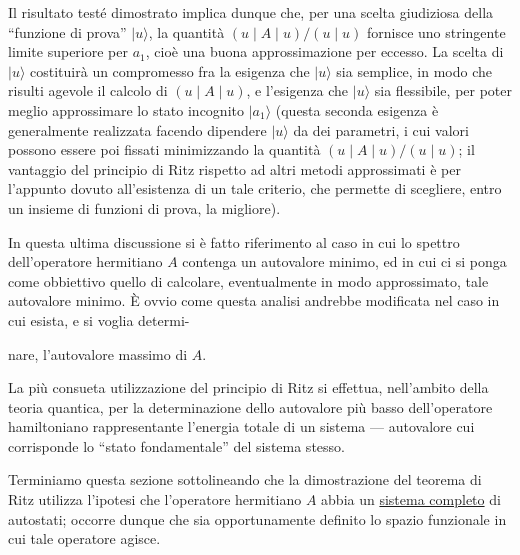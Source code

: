 \documentclass[11pt, a4paper]{book}
\numberwithin{equation}{section}
\begin{document}
Il risultato testé dimostrato implica dunque che, per una scelta
giudiziosa della ``funzione di prova'' $|u\rangle$, la quantità $(u \mid A \mid u)/(u \mid u)$
fornisce uno stringente limite superiore per $a_1$, cioè una buona approssimazione per eccesso. La scelta di $|u\rangle$ costituirà un compromesso
fra la esigenza che $|u\rangle$ sia semplice, in modo che risulti agevole
il calcolo di $(u \mid A \mid u)$, e l'esigenza che $|u\rangle$ sia flessibile,
per poter meglio approssimare lo stato incognito $|a_1\rangle$ (questa seconda
esigenza è generalmente realizzata facendo dipendere $|u\rangle$ da dei parametri, i cui valori possono essere poi fissati minimizzando la quantità
$(u \mid A \mid u) / (u \mid u)$; il vantaggio del principio di Ritz rispetto ad
altri metodi approssimati è per l'appunto dovuto all'esistenza di un tale
criterio, che permette di scegliere, entro un insieme di funzioni di prova,
la migliore).

In questa ultima discussione si è fatto riferimento al caso in cui
lo spettro dell'operatore hermitiano $A$ contenga un autovalore minimo,
ed in cui ci si ponga come obbiettivo quello di calcolare, eventualmente
in modo approssimato, tale autovalore minimo. È ovvio come questa
analisi andrebbe modificata nel caso in cui esista, e si voglia determi-


nare, l'autovalore massimo di $A$.

La più consueta utilizzazione del principio di Ritz si effettua, nell'ambito della teoria quantica, per la determinazione dello
autovalore più basso dell'operatore hamiltoniano rappresentante l'energia totale di un sistema --- autovalore cui corrisponde lo ``stato fondamentale'' del sistema stesso.

Terminiamo questa sezione sottolineando che la dimostrazione
del teorema di Ritz utilizza l'ipotesi che l'operatore hermitiano $A$ abbia
un \underline{sistema completo} di autostati; occorre dunque che sia opportunamente definito lo spazio funzionale in cui tale operatore agisce.
\end{document}
